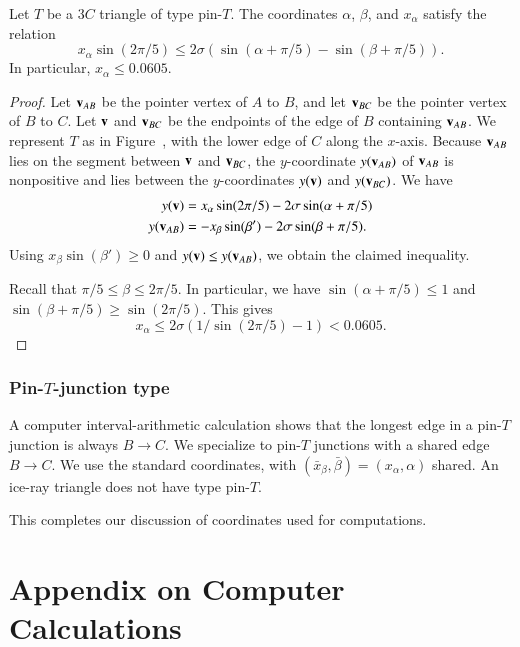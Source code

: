 \begin{lemma}
  Let $T$ be a $3C$ triangle of type pin-$T$.  The coordinates
  $\alpha$, $\beta$, and $x_\alpha$ satisfy the relation
\[
x_\alpha \sin(2\pi/5) \le 2\sigma (\sin(\alpha+\pi/5) - \sin(\beta+\pi/5)).
\]
In particular, $x_\alpha \le 0.0605$.
\end{lemma}

\begin{proof} Let ${\mathbf v}_{AB}$ be the pointer vertex of $A$ to $B$, and
  let ${\mathbf v}_{BC}$ be the pointer vertex of $B$ to $C$.  Let ${\mathbf v}$ and
  ${\mathbf v}_{BC}$ be the endpoints of the edge of $B$ containing ${\mathbf v}_{AB}$.
  We represent $T$ as in Figure~, with the lower edge of
  $C$ along the $x$-axis.  Because ${\mathbf v}_{AB}$ lies on the segment between
  ${\mathbf v}$ and ${\mathbf v}_{BC}$, the $y$-coordinate $y({\mathbf v}_{AB})$ of ${\mathbf v}_{AB}$ is
  nonpositive and lies between the $y$-coordinates $y({\mathbf v})$ and
  $y({\mathbf v}_{BC})$.  We have
\begin{align*}
y({\mathbf v}) &= x_\alpha \sin(2\pi/5) - 2\sigma\sin(\alpha+\pi/5)\\
y({\mathbf v}_{AB}) & = -x_\beta \sin(\beta') - 2\sigma\sin(\beta+\pi/5).
\end{align*}
Using $x_\beta \sin(\beta')\ge 0$ and $y({\mathbf v}) \le y({\mathbf v}_{AB})$, we
obtain the claimed inequality.

Recall that $\pi/5\le \beta \le 2\pi/5$.  In particular, we have
$\sin(\alpha+\pi/5) \le 1$ and $\sin(\beta+\pi/5)\ge \sin(2\pi/5)$.
This gives
\[
x_\alpha \le 2\sigma(1/\sin(2\pi/5) - 1) < 0.0605.
\]
\end{proof}

\subsubsection{Pin-$T$-junction type}

A computer interval-arithmetic calculation
shows that the longest edge in a pin-$T$ junction is always $B\to C$.  We specialize to
pin-$T$ junctions with a shared edge $B\to C$.  We use the standard
coordinates, with $(\bar x_\beta,\bar\beta)=(x_\alpha,\alpha)$ shared.
An ice-ray triangle does not have type pin-$T$.

This completes our discussion of coordinates used for computations.

\section{Appendix on Computer Calculations}

